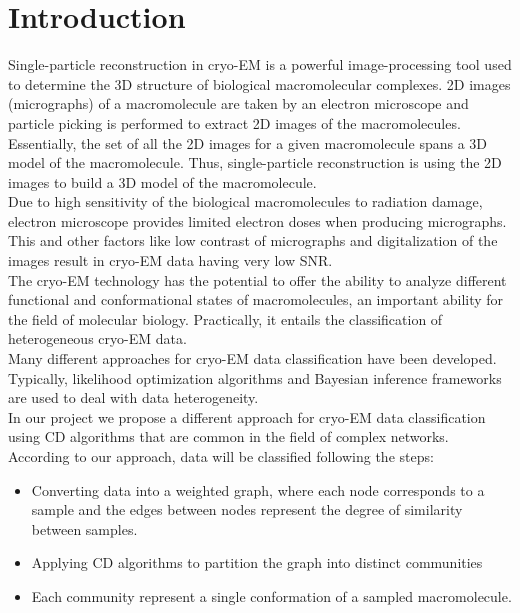 \center

\section{Introduction}

\raggedright

Single-particle reconstruction in \acrshort{cryo-EM} is a powerful image-processing tool used to determine the 3D structure of biological macromolecular complexes.
2D images (micrographs) of a macromolecule are taken by an electron microscope and particle picking is performed to extract 2D images of the macromolecules. Essentially, the set of all the 2D images for a given macromolecule spans a 3D model of the macromolecule. Thus, single-particle reconstruction is using the 2D images to build a 3D model of the macromolecule.\\

Due to high sensitivity of the biological macromolecules to radiation damage, electron microscope provides limited electron doses when producing micrographs. This and other factors like low contrast of micrographs and digitalization of the images result in \acrshort{cryo-EM} data having very low \acrfull{SNR}\cite{9016106}.\\

The \acrshort{cryo-EM} technology has the potential to offer the ability to analyze different functional and conformational states of macromolecules, an important ability for the field of molecular biology. Practically, it entails the classification of heterogeneous \acrshort{cryo-EM} data.\\

Many different approaches for \acrshort{cryo-EM} data classification have been developed. Typically, likelihood optimization algorithms and Bayesian inference frameworks are used to deal with data heterogeneity\cite{sigworth1998maximum,scheres2005fast,scheres2014beam,song2013flexibility,chowdhury2015structural}.\\ 

In our project we propose a different approach for \acrshort{cryo-EM} data classification using \acrfull{CD} algorithms that are common in the field of complex networks. According to our approach, data will be classified following the steps:
\begin{itemize}
	\item Converting data into a weighted graph, where each node corresponds to a sample and the edges between nodes represent the degree of similarity between samples.
	\item Applying \acrlong{CD} algorithms to partition the graph into distinct communities
	\item Each community represent a single conformation of a sampled macromolecule.
\end{itemize}

